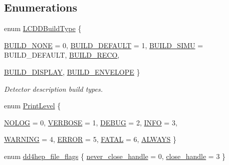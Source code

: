 \subsection*{Enumerations}
\begin{DoxyCompactItemize}
\item 
enum \hyperlink{namespace_d_d4hep_acafe43ba4537ab6e999e808142965fab}{LCDDBuildType} \{ \par
\hyperlink{namespace_d_d4hep_acafe43ba4537ab6e999e808142965faba640bf17b4ac1e133c23f07c8c983c6f7}{BUILD\_\-NONE} =  0, 
\hyperlink{namespace_d_d4hep_acafe43ba4537ab6e999e808142965fabaceac720f961afd2369fcc9f343113a2e}{BUILD\_\-DEFAULT} =  1, 
\hyperlink{namespace_d_d4hep_acafe43ba4537ab6e999e808142965faba8c3847bad85ccef6c9240131de017021}{BUILD\_\-SIMU} =  BUILD\_\-DEFAULT, 
\hyperlink{namespace_d_d4hep_acafe43ba4537ab6e999e808142965faba9c4bfd1d0144d79c9a880703ba87a972}{BUILD\_\-RECO}, 
\par
\hyperlink{namespace_d_d4hep_acafe43ba4537ab6e999e808142965fabadda35babdc91945a198025c3bec4e28b}{BUILD\_\-DISPLAY}, 
\hyperlink{namespace_d_d4hep_acafe43ba4537ab6e999e808142965faba3dd6e816b0b296c4ed843934356e3330}{BUILD\_\-ENVELOPE}
 \}
\begin{DoxyCompactList}\small\item\em Detector description build types. \item\end{DoxyCompactList}\item 
enum \hyperlink{namespace_d_d4hep_a5b5a64d56252469451f2020a27d57d42}{PrintLevel} \{ \par
\hyperlink{namespace_d_d4hep_a5b5a64d56252469451f2020a27d57d42aa90ed476f1bb3525c3896f25efd609c5}{NOLOG} =  0, 
\hyperlink{namespace_d_d4hep_a5b5a64d56252469451f2020a27d57d42a2c12bf245b6095423f62644ab1f5eedf}{VERBOSE} = 1, 
\hyperlink{namespace_d_d4hep_a5b5a64d56252469451f2020a27d57d42ad22cda76fc1b3a55bc359945db9c811c}{DEBUG} = 2, 
\hyperlink{namespace_d_d4hep_a5b5a64d56252469451f2020a27d57d42aae10bc5a07787c36af0a4c9921b262d2}{INFO} = 3, 
\par
\hyperlink{namespace_d_d4hep_a5b5a64d56252469451f2020a27d57d42ac24ff9a0f663cd47b4e4e37a977dff02}{WARNING} = 4, 
\hyperlink{namespace_d_d4hep_a5b5a64d56252469451f2020a27d57d42a54d5c1b9254fdf017c456cb972d26f96}{ERROR} = 5, 
\hyperlink{namespace_d_d4hep_a5b5a64d56252469451f2020a27d57d42a7bfb778cde0373aa4be752e638d8383b}{FATAL} = 6, 
\hyperlink{namespace_d_d4hep_a5b5a64d56252469451f2020a27d57d42a918099d24909b9384ac28d377dbf58f1}{ALWAYS}
 \}
\item 
enum \hyperlink{namespace_d_d4hep_a31d19f9b0ce567067d2897fbda1761e5}{dd4hep\_\-file\_\-flags} \{ \hyperlink{namespace_d_d4hep_a31d19f9b0ce567067d2897fbda1761e5a80c25250166976170fd59e1f3ee5041b}{never\_\-close\_\-handle} =  0, 
\hyperlink{namespace_d_d4hep_a31d19f9b0ce567067d2897fbda1761e5a99e11053d1afb0cb43c6a30f93741e76}{close\_\-handle} =  3
 \}
\end{DoxyCompactItemize}
